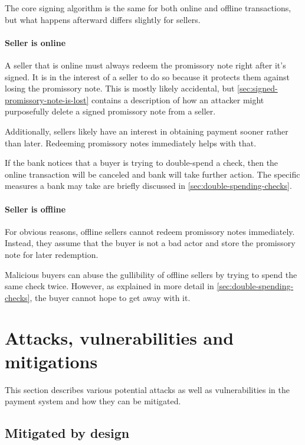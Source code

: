 \documentclass[12pt,a4paper]{article}
\begin{document}
\begin{multicols}{2}
	The core signing algorithm is the same for both online and offline transactions, but what happens afterward differs slightly for sellers.

	\paragraph{Seller is online}
	
	A seller that is online must always redeem the promissory note right after it's signed. It is in the interest of a seller to do so because it protects them against losing the promissory note. This is mostly likely accidental, but \autoref{sec:signed-promissory-note-is-lost} contains a description of how an attacker might purposefully delete a signed promissory note from a seller.

	Additionally, sellers likely have an interest in obtaining payment sooner rather than later. Redeeming promissory notes immediately helps with that.

	If the bank notices that a buyer is trying to double-spend a check, then the online transaction will be canceled and bank will take further action. The specific measures a bank may take are briefly discussed in \autoref{sec:double-spending-checks}.
	
	\paragraph{Seller is offline}
	
	For obvious reasons, offline sellers cannot redeem promissory notes immediately. Instead, they assume that the buyer is not a bad actor and store the promissory note for later redemption.

	Malicious buyers can abuse the gullibility of offline sellers by trying to spend the same check twice. However, as explained in more detail in \autoref{sec:double-spending-checks}, the buyer cannot hope to get away with it.

	\section{Attacks, vulnerabilities and mitigations}

	This section describes various potential attacks as well as vulnerabilities in the payment system and how they can be mitigated.
	
	\subsection{Mitigated by design}
	

\end{multicols}
\end{document}
